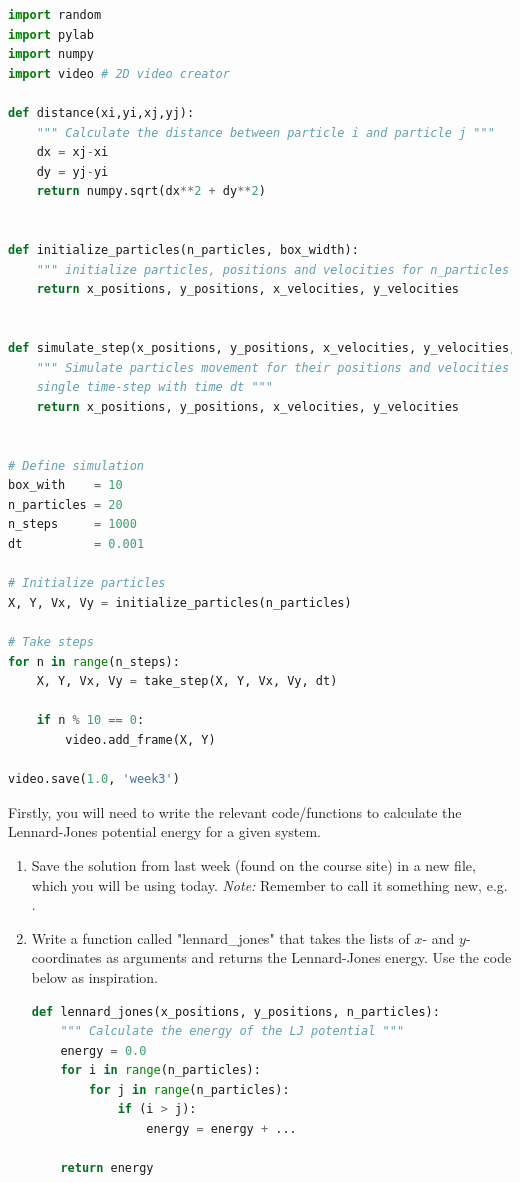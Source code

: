 \documentclass{article}
\begin{document}
\begin{lstlisting}[language=python]
import random
import pylab
import numpy
import video # 2D video creator

def distance(xi,yi,xj,yj):
    """ Calculate the distance between particle i and particle j """
    dx = xj-xi
    dy = yj-yi
    return numpy.sqrt(dx**2 + dy**2)


def initialize_particles(n_particles, box_width):
    """ initialize particles, positions and velocities for n_particles """
    return x_positions, y_positions, x_velocities, y_velocities


def simulate_step(x_positions, y_positions, x_velocities, y_velocities, dt):
    """ Simulate particles movement for their positions and velocities in a
    single time-step with time dt """
    return x_positions, y_positions, x_velocities, y_velocities


# Define simulation
box_with    = 10
n_particles = 20
n_steps     = 1000
dt          = 0.001

# Initialize particles
X, Y, Vx, Vy = initialize_particles(n_particles)

# Take steps
for n in range(n_steps):
    X, Y, Vx, Vy = take_step(X, Y, Vx, Vy, dt)

    if n % 10 == 0:
        video.add_frame(X, Y)

video.save(1.0, 'week3')

\end{lstlisting}

\newpage
\clearpage


Firstly, you will need to write the relevant code/functions to calculate the
Lennard-Jones potential energy for a given system.

\begin{enumerate}

    \item Save the solution from last week (found on the course site) in a new file, which you will be using today.
        {\em Note:} Remember to call it something new, e.g. .


    \item Write a function called "lennard\_jones" that takes the lists of $x$- and $y$-coordinates as arguments and returns the Lennard-Jones energy. Use the code below as inspiration.
\begin{lstlisting}[language=python]
def lennard_jones(x_positions, y_positions, n_particles):
    """ Calculate the energy of the LJ potential """
    energy = 0.0
    for i in range(n_particles):
        for j in range(n_particles):
            if (i > j):
                energy = energy + ...

    return energy
\end{lstlisting}

\end{enumerate}
\end{document}
